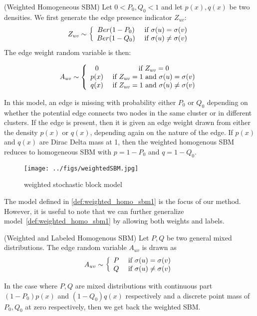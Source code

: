 \begin{definition}
\label{def:weighted_homo_sbm1}
(Weighted Homogeneous SBM) Let $0 < P_0, Q_0 < 1$ and let $p(x), q(x)$ be two densities. We first generate the edge presence indicator $Z_{uv}$:
\[
Z_{uv} \sim 
    \left\{ \begin{array}{cc}
    Ber(1-P_0) & \textrm{ if } \sigma(u) = \sigma(v) \\
    Ber(1-Q_0) & \textrm{ if } \sigma(u) \neq \sigma(v)
   \end{array} \right.
\]
The edge weight random variable is then:

\[
A_{uv} \sim \left\{ \begin{array}{cc} 
     0 & \textrm{ if } Z_{uv} = 0 \\
     p(x) & \textrm{ if } Z_{uv} = 1 \textrm{ and } \sigma(u) = \sigma(v) \\
     q(x) & \textrm{ if } Z_{uv} = 1 \textrm{ and } \sigma(u) \neq \sigma(v) 
\end{array} \right.
\]

\end{definition}

In this model, an edge is missing with probability either $P_0$ or $Q_0$ depending on whether the potential edge connects two nodes in the same cluster or in different clusters. If the edge is present, then it is given an edge weight drawn from either the density $p(x)$ or $q(x)$, depending again on the nature of the edge. If $p(x)$ and $q(x)$ are Dirac Delta mass at 1, then the weighted homogenous SBM reduces to homogeneous SBM with $p = 1 - P_0$ and $q = 1 - Q_0$. 

\begin{figure}[htp]
\centering
\texttt{[image: ../figs/weightedSBM.jpg]}
\caption{weighted stochastic block model}
\label{fig:weighted_stochastic_block_model}
\end{figure}


The model defined in \ref{def:weighted_homo_sbm1} is the focus of our method. However, it is useful to note that we can further generalize model~\ref{def:weighted_homo_sbm1} by allowing both weights and labels. 

\begin{definition} \label{def:weighted_homo_sbm2}
(Weighted and Labeled Homogenous SBM) Let $P, Q$ be two general mixed distributions. The edge random variable $A_{uv}$ is drawn as
\[
A_{uv} \sim \left\{ 
   \begin{array}{cc} 
   P & \textrm{ if } \sigma(u) = \sigma(v) \\
   Q & \textrm{ if } \sigma(u) \neq \sigma(v)
   \end{array} \right.
\]
\end{definition}
In the case where $P, Q$ are mixed distributions with continuous part $(1-P_0) p(x)$ and $(1-Q_0) q(x)$ respectively and a discrete point mass of $P_0, Q_0$ at zero respectively, then we get back the weighted SBM. 

